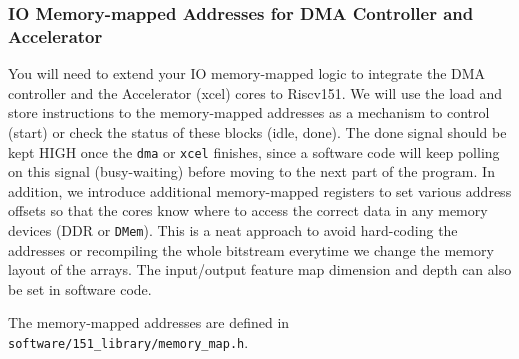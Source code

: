 \documentclass[11pt]{article}
\begin{document}
\subsubsection{IO Memory-mapped Addresses for DMA Controller and Accelerator}

You will need to extend your IO memory-mapped logic to integrate the DMA controller and the Accelerator (xcel) cores to Riscv151. We will use the load and store instructions to the memory-mapped addresses as a mechanism to control (start) or check the status of these blocks (idle, done). The done signal should be kept HIGH once the \texttt{dma} or \texttt{xcel} finishes, since a software code will keep polling on this signal (busy-waiting) before moving to the next part of the program. In addition, we introduce additional memory-mapped registers to set various address offsets so that the cores know where to access the correct data in any memory devices (DDR or \texttt{DMem}). This is a neat approach to avoid hard-coding the addresses or recompiling the whole bitstream everytime we change the memory layout of the arrays. The input/output feature map dimension and depth can also be set in software code.

The memory-mapped addresses are defined in \verb|software/151_library/memory_map.h|.
\end{document}
